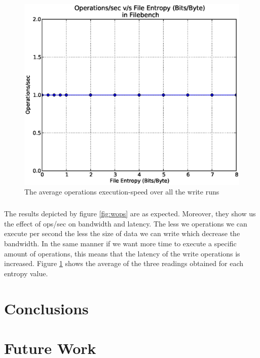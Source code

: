 \begin{figure}[H]
\begin{center}
\includegraphics[scale=.55]{../results/set2/write_ops_avg_2.eps}
\caption{The average operations execution-speed over all the write runs}
\label{fig:wopsavg}
\end{center}
\end{figure}

\paragraph{}
The results depicted by figure \ref{fig:wops} are as expected. Moreover, they show us the effect of ops/sec on bandwidth and latency. The less we operations we can execute per second the less the size of data we can write which decrease the bandwidth.
 In the same manner if we want more time to execute a specific amount of operations, this means that the latency of the write operations is increased. Figure \ref{fig:wopsavg} shows the average of the three readings obtained for each entropy value.

\chapter{Conclusions}\label{chap:conc}
\chapter{Future Work}\label{chap:fut}


